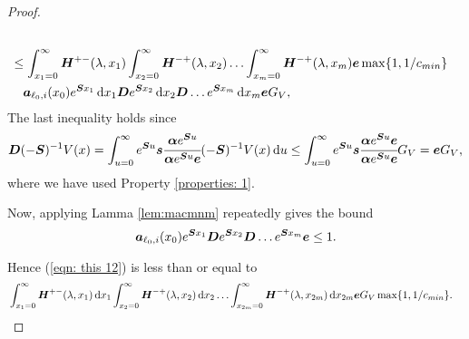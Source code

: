 \begin{proof}
\begin{align}
	\\&\leq\int_{x_1=0}^\infty \boldsymbol H^{+-} (\lambda,x_1)\nonumber
	\int_{x_2=0}^\infty \boldsymbol H^{-+} (\lambda,x_2) 
	\hdots \int_{x_m=0}^\infty \boldsymbol H^{-+} (\lambda, x_m) \boldsymbol e\max\{1, 1/c_{min}\}
	\\&\quad\boldsymbol   a_{\ell_0,i}(x_0)e^{\boldsymbol{S}x_1}\, \mathrm{d} x_1 \boldsymbol{D}e^{\boldsymbol{S}x_2} \, \mathrm{d} x_2 \boldsymbol{D}\dots e^{\boldsymbol{S}x_m} \, \mathrm{d} x_m \boldsymbol eG_V, \label{eqn: this 12}	
        \end{align}
        The last inequality holds since 
        \[\boldsymbol D(-\boldsymbol S)^{-1}V(x) = \int_{u=0}^\infty e^{\boldsymbol Su}\boldsymbol s\cfrac{\boldsymbol \alpha e^{\boldsymbol S u}}{\boldsymbol \alpha e^{\boldsymbol S u}\boldsymbol e}(-\boldsymbol S)^{-1}V(x)\, \mathrm{d} u \leq \int_{u=0}^\infty e^{\boldsymbol Su}\boldsymbol s\cfrac{\boldsymbol \alpha e^{\boldsymbol S u}\boldsymbol e}{\boldsymbol \alpha e^{\boldsymbol S u}\boldsymbol e}G_V = \boldsymbol eG_V,\]
        where we have used Property \ref{properties: 1}. 
        
	Now, applying Lamma \ref{lem:macmnm} repeatedly gives the bound  
	\[\boldsymbol   a_{\ell_0,i}(x_0)e^{\boldsymbol{S}x_1}\boldsymbol{D}e^{\boldsymbol{S}x_2} \boldsymbol{D}\dots e^{\boldsymbol{S}x_m} \boldsymbol e \leq 1.\]

	Hence (\ref{eqn: this 12}) is less than or equal to 
	\begin{align}
		& \int_{x_1=0}^\infty \boldsymbol H^{+-}(\lambda,x_1) \, \mathrm{d} x_1 \int_{x_2=0}^\infty \boldsymbol H^{-+}(\lambda,x_2)  \, \mathrm{d} x_2  
                	\hdots \int_{x_{2m}=0}^\infty \boldsymbol H^{-+}(\lambda, x_{2m})\, \mathrm{d} x_{2m}\boldsymbol e G_V\max\{1, 1/c_{min}\}. \label{eqn: this 123}
        \end{align}
	        

\end{proof}
